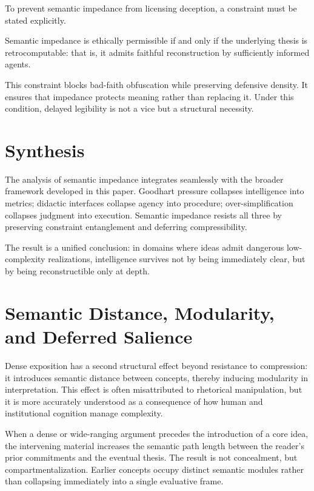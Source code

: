 To prevent semantic impedance from licensing deception, a constraint must be stated explicitly.

\begin{proposition}
Semantic impedance is ethically permissible if and only if the underlying thesis is retrocomputable: that is, it admits faithful reconstruction by sufficiently informed agents.
\end{proposition}

This constraint blocks bad-faith obfuscation while preserving defensive density. It ensures that impedance protects meaning rather than replacing it. Under this condition, delayed legibility is not a vice but a structural necessity.

\section{Synthesis}
\label{sec:synthesis}

The analysis of semantic impedance integrates seamlessly with the broader framework developed in this paper. Goodhart pressure collapses intelligence into metrics; didactic interfaces collapse agency into procedure; over-simplification collapses judgment into execution. Semantic impedance resists all three by preserving constraint entanglement and deferring compressibility.

The result is a unified conclusion: in domains where ideas admit dangerous low-complexity realizations, intelligence survives not by being immediately clear, but by being reconstructible only at depth.

\section{Semantic Distance, Modularity, and Deferred Salience}
\label{sec:distance}

Dense exposition has a second structural effect beyond resistance to compression: it introduces semantic distance between concepts, thereby inducing modularity in interpretation. This effect is often misattributed to rhetorical manipulation, but it is more accurately understood as a consequence of how human and institutional cognition manage complexity.

When a dense or wide-ranging argument precedes the introduction of a core idea, the intervening material increases the semantic path length between the reader’s prior commitments and the eventual thesis. The result is not concealment, but compartmentalization. Earlier concepts occupy distinct semantic modules rather than collapsing immediately into a single evaluative frame.

